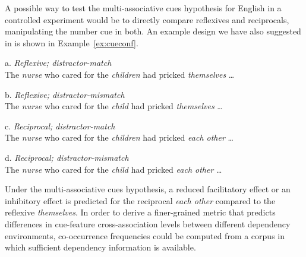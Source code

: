 \documentclass{cambridge7A}\usepackage[]{graphicx}\usepackage[]{color}
\begin{document}
A possible way to test the multi-associative cues hypothesis for English in a controlled experiment would be to directly compare reflexives and reciprocals, manipulating the number cue in both.
An example design we have also suggested in \cite{JaegerEngelmannVasishth2015} is shown in Example~\ref{ex:cueconf}.

\begin{exe}
\ex\label{ex:cueconf}
\begin{xlist}
\item  [a.] \textit{Reflexive; distractor-match}\\
The \textit{nurse} who cared for the \textit{children} had pricked \textit{themselves} \dots
\item  [b.] \textit{Reflexive; distractor-mismatch}\\
The \textit{nurse} who cared for the \textit{child} had pricked \textit{themselves} \dots
\item  [c.] \textit{Reciprocal; distractor-match}\\
The \textit{nurse} who cared for the \textit{children} had pricked \textit{each other} \dots
\item  [d.] \textit{Reciprocal; distractor-mismatch}\\
The \textit{nurse} who cared for the \textit{child} had pricked \textit{each other} \dots
\end{xlist}
\end{exe}  

Under the multi-associative cues hypothesis, a reduced facilitatory effect or an inhibitory effect is predicted for the reciprocal \textit{each other} compared to the reflexive \textit{themselves}. In order to derive a finer-grained metric that predicts differences in cue-feature cross-association levels between different dependency environments, co-occurrence frequencies could be computed from a corpus in which sufficient dependency information is available.
\end{document}
